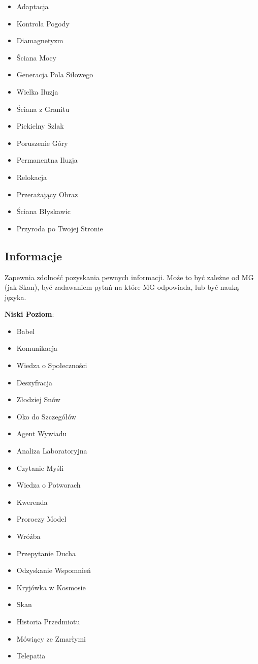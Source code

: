 \begin{itemize}
\item Adaptacja
\item Kontrola Pogody
\item Diamagnetyzm
\item Ściana Mocy
\item Generacja Pola Siłowego
\item Wielka Iluzja
\item Ściana z Granitu
\item Piekielny Szlak
\item Poruszenie Góry
\item Permanentna Iluzja
\item Relokacja
\item Przerażający Obraz
\item Ściana Błyskawic
\item Przyroda po Twojej Stronie
\end {itemize}

\subsection{Informacje}

Zapewnia zdolność pozyskania pewnych informacji. Może to być zależne od MG (jak Skan), być zadawaniem pytań na które MG odpowiada, lub być nauką języka.

\textbf{Niski Poziom}:

\begin{itemize}
\item Babel
\item Komunikacja
\item Wiedza o Społeczności
\item Deszyfracja
\item Złodziej Snów
\item Oko do Szczegółów
\item Agent Wywiadu
\item Analiza Laboratoryjna
\item Czytanie Myśli
\item Wiedza o Potworach
\item Kwerenda
\item Proroczy Model
\item Wróżba
\item Przepytanie Ducha
\item Odzyskanie Wspomnień
\item Kryjówka w Kosmosie
\item Skan
\item Historia Przedmiotu
\item Mówiący ze Zmarłymi
\item Telepatia
\end{itemize}

